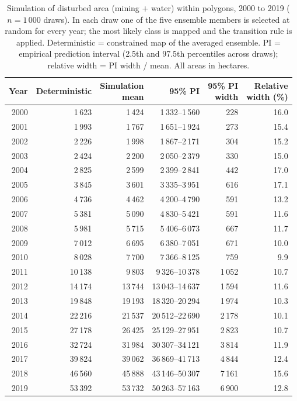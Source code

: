 \documentclass[]{interact}
\begin{document}
\begin{table}[H]
\centering
\small
\caption{Simulation of disturbed area (mining $+$ water) within polygons,
2000 to 2019 ($n = 1\,000$ draws). In each draw one of the five ensemble
members is selected at random for every year; the most likely class is
mapped and the transition rule is applied. Deterministic = constrained map
of the averaged ensemble. PI = empirical prediction interval (2.5th and
97.5th percentiles across draws); relative width = PI width / mean. All
areas in hectares.}
\label{tab:p3-simulation-diagnostics}
\begin{tabular}{@{}rrrrrr@{}}
\toprule
Year & Deterministic & \makecell[r]{Simulation\\mean} & 95\% PI & \makecell[r]{95\% PI\\width} & \makecell[r]{Relative\\width (\%)} \\
\midrule
2000 & 1\,623 & 1\,424 & 1\,332--1\,560 & 228 & 16.0 \\
2001 & 1\,993 & 1\,767 & 1\,651--1\,924 & 273 & 15.4 \\
2002 & 2\,226 & 1\,998 & 1\,867--2\,171 & 304 & 15.2 \\
2003 & 2\,424 & 2\,200 & 2\,050--2\,379 & 330 & 15.0 \\
2004 & 2\,825 & 2\,599 & 2\,399--2\,841 & 442 & 17.0 \\
2005 & 3\,845 & 3\,601 & 3\,335--3\,951 & 616 & 17.1 \\
2006 & 4\,736 & 4\,462 & 4\,200--4\,790 & 591 & 13.2 \\
2007 & 5\,381 & 5\,090 & 4\,830--5\,421 & 591 & 11.6 \\
2008 & 5\,981 & 5\,715 & 5\,406--6\,073 & 667 & 11.7 \\
2009 & 7\,012 & 6\,695 & 6\,380--7\,051 & 671 & 10.0 \\
2010 & 8\,028 & 7\,700 & 7\,366--8\,125 & 759 & 9.9 \\
2011 & 10\,138 & 9\,803 & 9\,326--10\,378 & 1\,052 & 10.7 \\
2012 & 14\,174 & 13\,744 & 13\,043--14\,637 & 1\,594 & 11.6 \\
2013 & 19\,848 & 19\,193 & 18\,320--20\,294 & 1\,974 & 10.3 \\
2014 & 22\,216 & 21\,537 & 20\,512--22\,690 & 2\,178 & 10.1 \\
2015 & 27\,178 & 26\,425 & 25\,129--27\,951 & 2\,823 & 10.7 \\
2016 & 32\,724 & 31\,984 & 30\,307--34\,121 & 3\,814 & 11.9 \\
2017 & 39\,824 & 39\,062 & 36\,869--41\,713 & 4\,844 & 12.4 \\
2018 & 46\,560 & 45\,888 & 43\,146--50\,307 & 7\,161 & 15.6 \\
2019 & 53\,392 & 53\,732 & 50\,263--57\,163 & 6\,900 & 12.8 \\
\bottomrule
\end{tabular}
\end{table}
\end{document}
